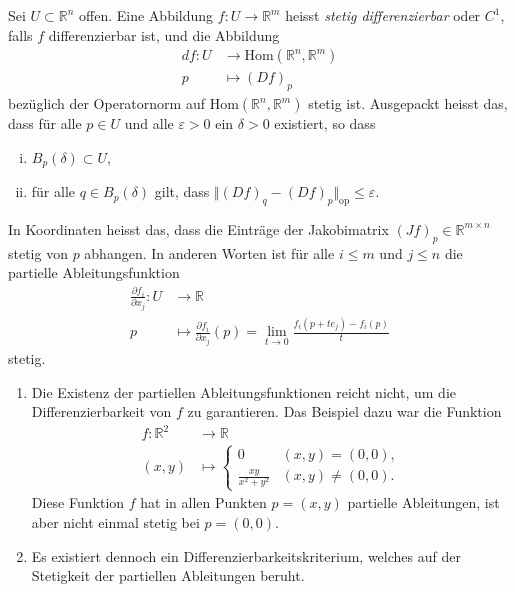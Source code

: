 \documentclass[../main.tex]{subfiles}
\begin{document}
\begin{definition}
  Sei $U \subset \mathbb{R}^n$ offen.
  Eine Abbildung $f \colon U \to \mathbb{R}^m$ heisst
  \emph{stetig differenzierbar} oder $C^1$,
  falls $f$ differenzierbar ist, und die Abbildung
  \begin{align*}
    df \colon U & \to \text{Hom}(\mathbb{R}^n, \mathbb{R}^m) \\
    p & \mapsto {(Df)}_p
  \end{align*}
  bezüglich der Operatornorm auf $\text{Hom}(\mathbb{R}^n, \mathbb{R}^m)$
  stetig ist.
  Ausgepackt heisst das, dass für alle $p \in U$
  und alle $\varepsilon > 0$ ein $\delta > 0$
  existiert, so dass
  \begin{enumerate}[(i)]
    \item $B_p(\delta) \subset U$,
    \item für alle $q \in B_p(\delta)$ gilt, dass
      $\Vert {(Df)}_q - {(Df)}_p \Vert_{\text{op}} \leq \varepsilon$.
  \end{enumerate}
\end{definition}

In Koordinaten heisst das, dass die Einträge der
Jakobimatrix ${(Jf)}_p \in \mathbb{R}^{m \times n}$ stetig
von $p$ abhangen.
In anderen Worten ist für alle $i \leq m$ und $j \leq n$
die partielle Ableitungsfunktion
\begin{align*}
  \frac{\partial f_i}{\partial x_j} \colon U & \to \mathbb{R} \\
  p & \mapsto \frac{\partial f_i}{\partial x_j}(p)
  = \lim_{t \to 0} \frac{f_i(p + te_j) - f_i(p)}{t}
\end{align*}
stetig.

\begin{remarks}
  \leavevmode
  \begin{enumerate}[(1)]
    \item Die Existenz der partiellen Ableitungsfunktionen
      reicht nicht, um die Differenzierbarkeit von $f$ zu garantieren.
      Das Beispiel dazu war die Funktion
      \begin{align*}
        f \colon \mathbb{R}^2 & \to \mathbb{R} \\
        (x, y) & \mapsto
        \begin{cases}
          0 & (x, y) = (0, 0),\\
          \frac{xy}{x^2 + y^2} & (x, y) \neq (0, 0).
        \end{cases}
      \end{align*}
      Diese Funktion $f$ hat in allen Punkten $p = (x, y)$ partielle
      Ableitungen, ist aber nicht einmal stetig bei $p = (0, 0)$.
    \item Es existiert dennoch ein Differenzierbarkeitskriterium,
      welches auf der Stetigkeit der partiellen Ableitungen beruht.
  \end{enumerate}
\end{remarks}
\end{document}
